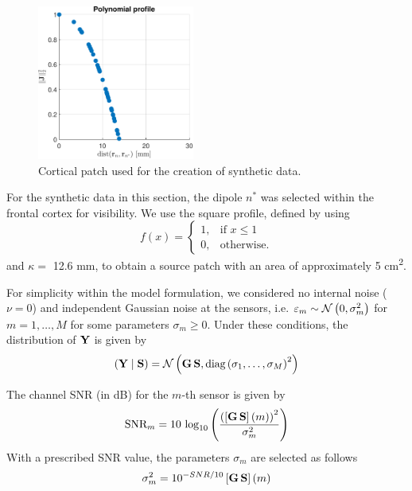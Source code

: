 \begin{figure}
\includegraphics[height=2in]{./img_MATLAB/circ_Profile}
\caption{Cortical patch used for the creation of synthetic data.}
\label{fig:exaple_true}
\end{figure}


For the synthetic data in this section, the dipole $n^*$ was selected within the frontal cortex for visibility.
%
We use the square profile, defined by using
\begin{equation}
f(x) = \begin{cases}
1, &\text{if } x\leq 1 \\
0, &\text{otherwise}.
\end{cases}
\end{equation}
and $\kappa = $ 12.6 \si{mm}, to obtain a source patch with an area of approximately 5 \si{cm^2}.

For simplicity within the model formulation, we considered no internal noise ($\nu=0$) and independent Gaussian noise at the sensors, i.e. $\varepsilon_m \sim\mathcal{N}\left( 0, \sigma_m^2 \right)$ for $m = 1, \dots, M$ for some parameters $\sigma_m\geq 0$.
%
Under these conditions, the distribution of $\mathbf{Y}$ is given by
\begin{equation}
\left( \mathbf{Y} \;\middle|\; \mathbf{S} \right) =
\mathcal{N}\left(  \mathbf{G}\, \mathbf{S}, \text{diag}\left(  \sigma_1, \dots, \sigma_M  \right)^2  \right)
\end{equation}

The channel SNR (in dB) for the $m$-th sensor is given by
\begin{equation}
\text{SNR}_m = 
10\, \log_{10}\left(  \frac{ \left(  \left[ \mathbf{G}\, \mathbf{S} \right](m) \right)^2 }{\sigma_m^2}  \right)
\end{equation}
With a prescribed SNR value, the parameters $\sigma_m$ are selected as follows
\begin{equation}
\sigma_m^2 = 
10^{{-{SNR}/{10}} }
\left[ \mathbf{G}\, \mathbf{S} \right](m)
\end{equation}

